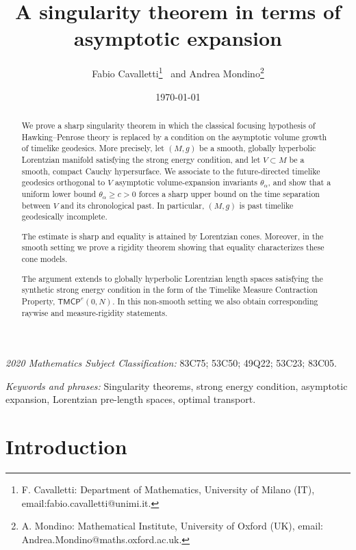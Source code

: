 \documentclass[a4paper,10pt]{article}
\title{A singularity theorem in terms of asymptotic  expansion}
\author{Fabio Cavalletti\orcidlink{0000-0003-2494-9029}\thanks{F. Cavalletti: Department of Mathematics, University of Milano (IT), email:fabio.cavalletti@unimi.it.} \ and Andrea Mondino\orcidlink{0000-0002-1932-7148}\thanks{A. Mondino: Mathematical Institute,  University of Oxford  (UK), email: Andrea.Mondino@maths.oxford.ac.uk.}}
\date{\today}
\newcommand{\TMCP}{\mathsf{TMCP}}
\theoremstyle{plain}
\theoremstyle{definition}
\numberwithin{equation}{section}
\providecommand{\keywords}[1]{\small{\textit{Keywords and phrases:} #1}}
\providecommand{\subjclass}[1]{\small{\textit{2020 Mathematics Subject Classification:} #1}}
\begin{document}
\maketitle



\begin{abstract}
We prove a sharp singularity theorem in which the classical focusing
hypothesis of Hawking--Penrose theory is replaced by a condition on the
asymptotic volume growth of timelike geodesics. More precisely, let
$(M,g)$ be a smooth, globally hyperbolic Lorentzian manifold satisfying
the strong energy condition, and let $V\subset M$ be a smooth, compact
Cauchy hypersurface. We associate to the future-directed timelike
geodesics orthogonal to $V$ asymptotic volume-expansion invariants
$\theta_\alpha$, and show that a uniform lower bound
$\theta_\alpha\ge c>0$ forces a sharp upper bound on the time separation
between $V$ and its chronological past. In particular, $(M,g)$ is past
timelike geodesically incomplete.

The estimate is sharp and equality is attained by Lorentzian cones.
Moreover, in the smooth setting we prove a rigidity theorem showing that
equality characterizes these cone models.

The argument extends to globally hyperbolic Lorentzian length spaces
satisfying the synthetic strong energy condition in the form of the
Timelike Measure Contraction Property, $\TMCP^e(0,N)$. In this non-smooth setting we also
obtain corresponding raywise and measure-rigidity statements.
\end{abstract}



\subjclass{83C75; 53C50; 49Q22; 53C23;  83C05.}\smallskip

\keywords{Singularity theorems, strong energy condition, asymptotic expansion, Lorentzian pre-length spaces, optimal transport.}










\tableofcontents



\section{Introduction}
\end{document}
